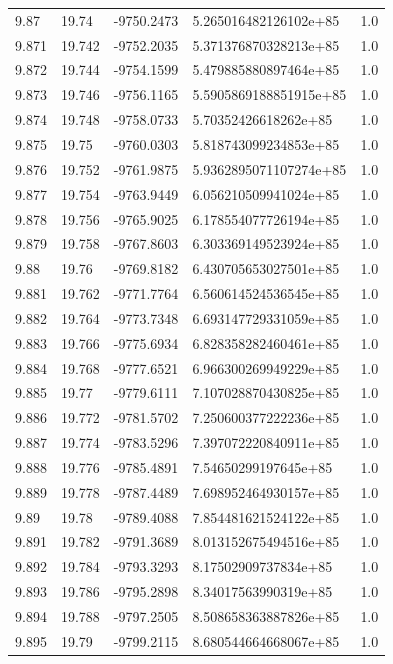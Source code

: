 \begin{tabular}{lllll}
9.87 & 19.74 & -9750.2473 & 5.265016482126102e+85 & 1.0 \\
9.871 & 19.742 & -9752.2035 & 5.371376870328213e+85 & 1.0 \\
9.872 & 19.744 & -9754.1599 & 5.479885880897464e+85 & 1.0 \\
9.873 & 19.746 & -9756.1165 & 5.5905869188851915e+85 & 1.0 \\
9.874 & 19.748 & -9758.0733 & 5.70352426618262e+85 & 1.0 \\
9.875 & 19.75 & -9760.0303 & 5.818743099234853e+85 & 1.0 \\
9.876 & 19.752 & -9761.9875 & 5.9362895071107274e+85 & 1.0 \\
9.877 & 19.754 & -9763.9449 & 6.056210509941024e+85 & 1.0 \\
9.878 & 19.756 & -9765.9025 & 6.178554077726194e+85 & 1.0 \\
9.879 & 19.758 & -9767.8603 & 6.303369149523924e+85 & 1.0 \\
9.88 & 19.76 & -9769.8182 & 6.430705653027501e+85 & 1.0 \\
9.881 & 19.762 & -9771.7764 & 6.560614524536545e+85 & 1.0 \\
9.882 & 19.764 & -9773.7348 & 6.693147729331059e+85 & 1.0 \\
9.883 & 19.766 & -9775.6934 & 6.828358282460461e+85 & 1.0 \\
9.884 & 19.768 & -9777.6521 & 6.966300269949229e+85 & 1.0 \\
9.885 & 19.77 & -9779.6111 & 7.107028870430825e+85 & 1.0 \\
9.886 & 19.772 & -9781.5702 & 7.250600377222236e+85 & 1.0 \\
9.887 & 19.774 & -9783.5296 & 7.397072220840911e+85 & 1.0 \\
9.888 & 19.776 & -9785.4891 & 7.54650299197645e+85 & 1.0 \\
9.889 & 19.778 & -9787.4489 & 7.698952464930157e+85 & 1.0 \\
9.89 & 19.78 & -9789.4088 & 7.854481621524122e+85 & 1.0 \\
9.891 & 19.782 & -9791.3689 & 8.013152675494516e+85 & 1.0 \\
9.892 & 19.784 & -9793.3293 & 8.17502909737834e+85 & 1.0 \\
9.893 & 19.786 & -9795.2898 & 8.34017563990319e+85 & 1.0 \\
9.894 & 19.788 & -9797.2505 & 8.508658363887826e+85 & 1.0 \\
9.895 & 19.79 & -9799.2115 & 8.680544664668067e+85 & 1.0 \\

\end{tabular}
